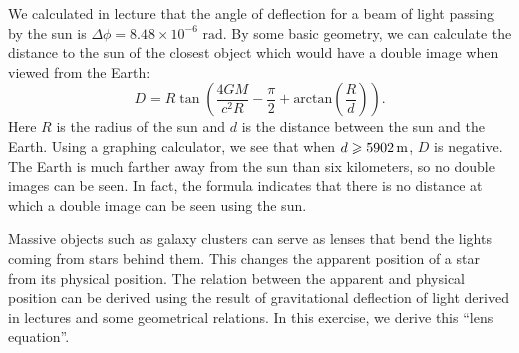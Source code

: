 \documentclass{../../templates/lkx_pset}
\begin{document}
\begin{solution}
  We calculated in lecture that the angle of deflection for a beam of light passing by the sun is $\Delta\phi = 8.48\times 10^{-6}\textrm{ rad}$. By some basic geometry, we can calculate the distance to the sun of the closest object which would have a double image when viewed from the Earth:
  \[
    D = R\tan\left(\frac{4GM}{c^2 R} - \frac{\pi}{2} + \textrm{arctan}\left(\frac{R}{d}\right)\right).
  \]
  Here $R$ is the radius of the sun and $d$ is the distance between the sun and the Earth. Using a graphing calculator, we see that when $d\geq \msi{5902}$, $D$ is negative. The Earth is much farther away from the sun than six kilometers, so no double images can be seen. In fact, the formula indicates that there is no distance at which a double image can be seen using the sun.
\end{solution}

\begin{problem}{3}
  Massive objects such as galaxy clusters can serve as lenses that bend the lights coming from stars behind them. This changes the apparent position of a star from its physical position. The relation between the apparent and physical position can be derived using the result of gravitational deflection of light derived in lectures and some geometrical relations. In this exercise, we derive this ``lens equation''.
\end{problem}
\end{document}
